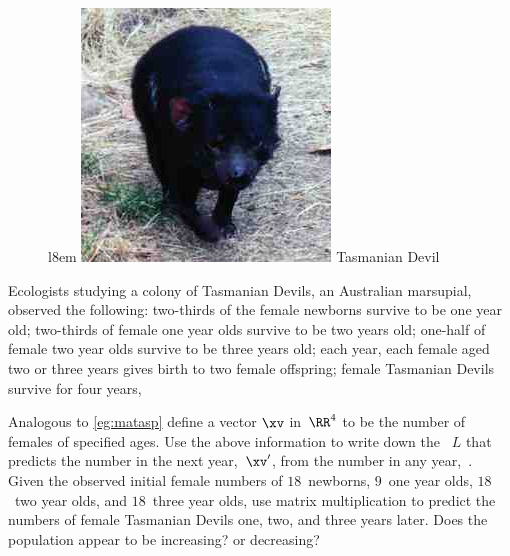 \begin{exercise}  
\begin{figure}l{8em}
\includegraphics[width=\linewidth]{Matrices/tasmanianDevil}
Tasmanian Devil
\end{figure}
Ecologists studying a colony of Tasmanian Devils, an Australian marsupial, observed the following:
two-thirds of the female newborns survive to be one year old;
two-thirds of female one year olds survive to be two years old;
one-half of female two year olds survive to be three years old;
each year, each female aged two or three years gives birth to two female offspring;
female Tasmanian Devils survive for four years, 

Analogous to \cref{eg:matasp} define a vector \(\xv\) in~\(\RR^4\) to be the number of females of specified ages.
Use the above information to write down the ~\(L\) that predicts the number in the next year,~\(\xv'\), from the number in any year,~\xv.
Given the observed initial female numbers of \(18\)~newborns, \(9\)~one year olds, \(18\)~two year olds, and \(18\)~three year olds, use matrix multiplication to predict the numbers of female Tasmanian Devils one, two, and three years later.
Does the population appear to be increasing? or decreasing?
\end{exercise}


